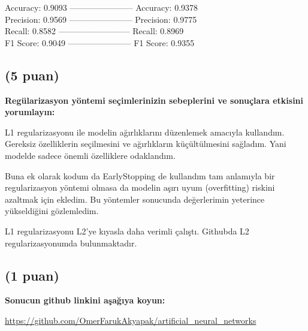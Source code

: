 \documentclass[11pt]{article}
\begin{document}
Accuracy: 0.9093 ----------------------- Accuracy: 0.9378  \\
Precision: 0.9569 ----------------------- Precision: 0.9775 \\
Recall: 0.8582 -------------------------- Recall: 0.8969    \\
F1 Score: 0.9049 ----------------------- F1 Score: 0.9355

\subsection{(5 puan)} \textbf{Regülarizasyon yöntemi seçimlerinizin sebeplerini ve sonuçlara etkisini yorumlayın:}

 L1 regularizasyonu ile modelin ağırlıklarını düzenlemek amacıyla kullandım. Gereksiz özelliklerin seçilmesini ve ağırlıkların küçültülmesini sağladım. Yani modelde sadece önemli özelliklere odaklandım. 
 
 Buna ek olarak kodum da EarlyStopping de kullandım tam anlamıyla bir regularizasyon yöntemi olmasa da modelin aşırı uyum (overfitting) riskini azaltmak için ekledim. Bu yöntemler sonucunda değerlerimin yeterince yükseldiğini gözlemledim. 
 
 L1 regularizasyonu L2'ye kıyasla daha verimli çalıştı. Githubda L2 regularizasyonumda bulunmaktadır.

\subsection{(1 puan)} \textbf{Sonucun github linkini  aşağıya koyun:}

\url{https://github.com/OmerFarukAkyapak/artificial_neural_networks}
\end{document}
